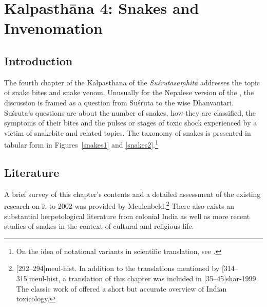 \chapter{Kalpasthāna 4: Snakes and Invenomation}

\section{Introduction} 

The fourth chapter of the Kalpasthāna of the \emph{Suśrutasaṃhitā}
addresses the topic of snake bites and snake venom. Unusually for the
Nepalese version of the \SS, the discussion is framed as a question from
Suśruta to the wise Dhanvantari.  Suśruta's questions are about the
number of snakes, how they are classified, the symptoms of their bites
and the pulses or stages of toxic shock experienced by a victim of
snakebite and related topics.  The taxonomy of snakes is presented in 
tabular form in Figures~\ref{snakes1} and
\ref{snakes2}.\footnote{On the idea of notational variants in scientific
    translation, see \cites{elsh-2008}{saru-2016}[81--83]{wuja-2021}.}
    
    

\section{Literature} 

A brief survey of this chapter's contents and a detailed assessment of
the existing research on it to 2002 was provided by
Meulenbeld.\footnote{[292--294]{meul-hist}. In addition to the
    translations mentioned by [314--315]{meul-hist}, a translation
    of this chapter was included in [35--45]{shar-1999}. The classic 
    work of \citet[\P93]{joll-1951} offered a short but accurate overview of 
    Indian toxicology.}  There
    also exists an substantial herpetological literature from colonial India
    as well as more recent studies of snakes in the context of cultural and
    religious life.



